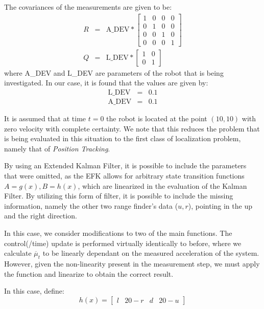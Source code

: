 \documentclass[english]{article}
\begin{document}
The covariances of the measurements are given to be:
\begin{eqnarray}
R &=& \mathrm{A\_DEV} * \left[ \begin{array}{cccc}
1&0&0&0\\
0&1&0&0\\
0&0&1&0\\
0&0&0&1 \end{array} \right] \\
Q &=& \mathrm{L\_DEV} * \left[ \begin{array}{cc}
1&0\\
0&1 \end{array} \right]
\end{eqnarray}
where A\_DEV and L\_DEV are parameters of the robot that is being investigated. In our case, it is found that the values are given by:
\begin{eqnarray}
\mathrm{L\_DEV} &=& 0.1 \\
\mathrm{A\_DEV} &=& 0.1
\end{eqnarray}

It is assumed that at time $t=0$ the robot is located at the point $(10, 10)$ with zero velocity with complete certainty. We note that this reduces the problem that is being evaluated in this situation to the first class of localization problem, namely that of \emph{Position Tracking}.

By using an Extended Kalman Filter, it is possible to include the parameters that were omitted, as the EFK allows for arbitrary state transition functions $A=g(x), B=h(x)$, which are linearized in the evaluation of the Kalman Filter. By utilizing this form of filter, it is possible to include the missing information, namely the other two range finder's data ($u, r$), pointing in the up and the right direction.

In this case, we consider modifications to two of the main functions. The control(/time) update is performed virtually identically to before, where we calculate $\overline{\mu}_t$ to be linearly dependant on the measured acceleration of the system. However, given the non-linearity present in the measurement step, we must apply the function and linearize to obtain the correct result.

In this case, define:
\begin{equation}
h(x) = \left[ \begin{array}{cccc}l&20-r&d&20-u\end{array}\right]
\end{equation}
\end{document}
